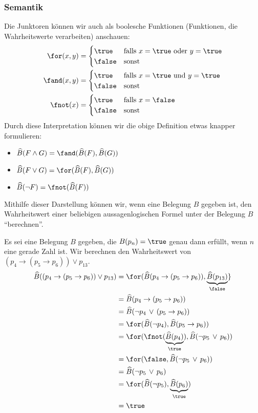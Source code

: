 \subsubsection{Semantik}

\begin{remark}
    Die Junktoren können wir auch als boolesche Funktionen (Funktionen, die
    Wahrheitswerte verarbeiten) anschauen:
\begin{align*}
\for(x,y) &= \begin{cases}
\true&\text{falls }x=\true\text{ oder }y=\true\\
\false&\text{sonst}
\end{cases}\\
\fand(x,y) &= \begin{cases}
\true&\text{falls }x=\true\text{ und }y=\true\\
\false&\text{sonst}
\end{cases}\\
\fnot(x) &=\begin{cases}
\true&\text{falls }x=\false\\
\false&\text{sonst}
\end{cases}
\end{align*}
Durch diese Interpretation können wir die obige Definition etwas knapper formulieren:
\begin{itemize}
\item $\widehat{B}(F\land G)=\fand(\widehat{B}(F),\widehat{B}(G))$
\item $\widehat{B}(F\lor G)=\for(\widehat{B}(F),\widehat{B}(G))$
\item $\widehat{B}(\neg F)=\fnot(\widehat{B}(F))$
\end{itemize}
Mithilfe dieser Darstellung können wir, wenn eine Belegung $B$ gegeben ist, den Wahrheitswert einer beliebigen aussagenlogischen Formel unter der Belegung $B$ ``berechnen''.
\end{remark}

\begin{example}
Es sei eine Belegung $B$ gegeben, die $B(p_n)=\true$ genau dann erfüllt, wenn $n$ eine
gerade Zahl ist. Wir berechnen den Wahrheitswert von $(p_4\to(p_5\to p_6))\lor p_{13}.$
\tcblower
\begin{align*}
\widehat{B}((p_4\to(p_5\to p_6))\lor p_{13})&=\for(\widehat{B}(p_4\to(p_5\to p_6)),
\underbrace{\widehat{B}(p_{13})}_{\false}\}\\
&=\widehat{B}(p_4\to(p_5\to p_6))\\
&=\widehat{B}(\neg p_4\,\lor\,(p_5\to p_6))\\
&=\for(\widehat{B}(\neg p_4),\widehat{B}(p_5\to p_6))\\
&=\for( \fnot(\underbrace{\widehat{B}( p_4)}_{\true}),\widehat{B}(\neg p_5\,\lor\,
p_6))\\
&=\for( \false,\widehat{B}(\neg p_5\,\lor\,
p_6))\\
&=\widehat{B}(\neg p_5\,\lor\, p_6)\\
&=\for(\widehat{B}(\neg p_5),\underbrace{\widehat{B}(p_6)}_{\true})\\
&=\true
\end{align*}
\end{example}


